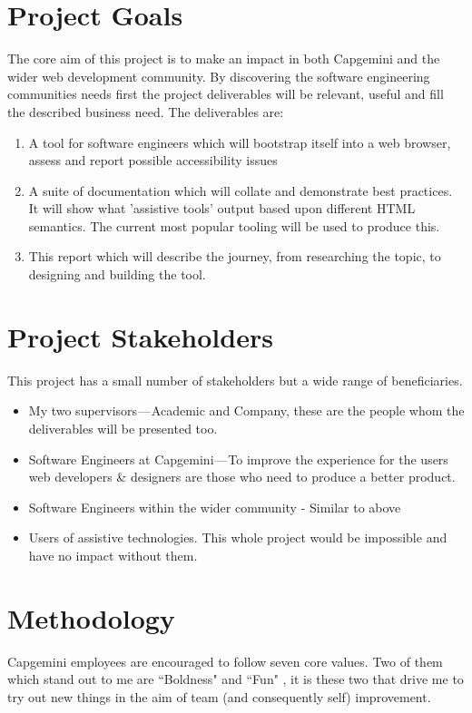 \section{Project Goals}
The core aim of this project is to make an impact in both Capgemini and the
wider web development community. By discovering the software
engineering communities needs first
the project deliverables will be relevant, useful and fill the described
business need. The deliverables are:
\begin{enumerate}
  \item A tool for software engineers which will bootstrap itself into a web
browser, assess and report possible accessibility issues
  \item A suite of documentation which will collate and demonstrate best
practices. It will show what 'assistive tools' output based upon different
HTML semantics. The current most popular tooling will be used to produce this.
  \item This report which will describe the journey, from researching the
topic, to designing and building the tool.
\end{enumerate}

\section{Project Stakeholders}
This project has a small number of stakeholders but a wide range of beneficiaries.
\begin{itemize}
  \item My two supervisors — Academic and Company, these are the people whom
  the deliverables will be presented too.
  \item Software Engineers at Capgemini — To improve the experience for the
  users web developers \& designers are those who need to produce a better
  product.
  \item Software Engineers within the wider community - Similar to above
  \item Users of assistive technologies. This whole project would be
    impossible and have no impact without them.
\end{itemize}

\section{Methodology}
Capgemini employees are encouraged to follow seven core values. Two of them
which stand out to me are ``Boldness" and ``Fun" \citep{CapValues}, it is these
two that drive me to try out new things in the aim of team (and consequently
self) improvement.

